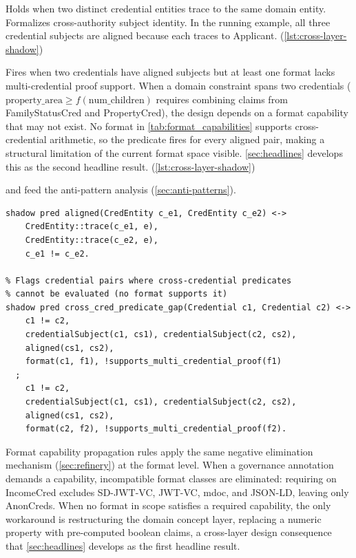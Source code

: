 \begin{description}
\tightlist
\item[aligned(c\_e1, c\_e2): shadow predicate (C1)]
Holds when two distinct credential entities trace to the same domain entity. Formalizes cross-authority subject identity. In the running example, all three credential subjects are aligned because each traces to Applicant. (\autoref{lst:cross-layer-shadow})
\item[cross\_cred\_predicate\_gap(c1, c2): shadow predicate (C9)]
Fires when two credentials have aligned subjects but at least one format lacks multi-credential proof support. When a domain constraint spans two credentials (\(\text{property\_area} \geq f(\text{num\_children})\) requires combining claims from FamilyStatusCred and PropertyCred), the design depends on a format capability that may not exist. No format in \autoref{tab:format_capabilities} supports cross-credential arithmetic, so the predicate fires for every aligned pair, making a structural limitation of the current format space visible. \autoref{sec:headlines} develops this as the second headline result. (\autoref{lst:cross-layer-shadow})
\end{description}

 and  feed the anti-pattern analysis (\autoref{sec:anti-patterns}).

\begin{lstlisting}[style=refinery, caption={Cross-layer shadow predicates: entity alignment and cross-credential predicate gap}, label=lst:cross-layer-shadow]
% Entity alignment: two CredEntities tracing to the same Entity
shadow pred aligned(CredEntity c_e1, CredEntity c_e2) <->
    CredEntity::trace(c_e1, e),
    CredEntity::trace(c_e2, e),
    c_e1 != c_e2.

% Flags credential pairs where cross-credential predicates
% cannot be evaluated (no format supports it)
shadow pred cross_cred_predicate_gap(Credential c1, Credential c2) <->
    c1 != c2,
    credentialSubject(c1, cs1), credentialSubject(c2, cs2),
    aligned(cs1, cs2),
    format(c1, f1), !supports_multi_credential_proof(f1)
  ;
    c1 != c2,
    credentialSubject(c1, cs1), credentialSubject(c2, cs2),
    aligned(cs1, cs2),
    format(c2, f2), !supports_multi_credential_proof(f2).
\end{lstlisting}

Format capability propagation rules apply the same negative elimination mechanism (\autoref{sec:refinery}) at the format level. When a governance annotation demands a capability, incompatible format classes are eliminated: requiring  on IncomeCred excludes SD-JWT-VC, JWT-VC, mdoc, and JSON-LD, leaving only AnonCreds. When no format in scope satisfies a required capability, the only workaround is restructuring the domain concept layer, replacing a numeric property with pre-computed boolean claims, a cross-layer design consequence that \autoref{sec:headlines} develops as the first headline result.

